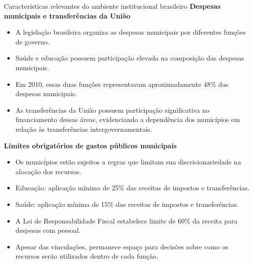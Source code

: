 \documentclass[
  10pt,
  ignorenonframetext,
  aspectratio=169,
  brazilian,
]{beamer}
\begin{document}
\begin{frame}{Características relevantes do ambiente institucional
brasileiro}
\protect{}\label{caracteruxedsticas-relevantes-do-ambiente-institucional-brasileiro}
\textbf{Despesas municipais e transferências da União}

\begin{itemize}
\item
  A legislação brasileira organiza as despesas municipais por diferentes
  funções de governo.
\item
  Saúde e educação possuem participação elevada na composição das
  despesas municipais.
\item
  Em 2010, essas duas funções representavam aproximadamente 48\% das
  despesas municipais.
\item
  As transferências da União possuem participação significativa no
  financiamento dessas áreas, evidenciando a dependência dos municípios
  em relação às transferências intergovernamentais.
\end{itemize}

\textbf{Limites obrigatórios de gastos públicos municipais}

\begin{itemize}
\item
  Os municípios estão sujeitos a regras que limitam sua
  discricionariedade na alocação dos recursos.
\item
  Educação: aplicação mínima de 25\% das receitas de impostos e
  transferências.
\item
  Saúde: aplicação mínima de 15\% das receitas de impostos e
  transferências.
\item
  A Lei de Responsabilidade Fiscal estabelece limite de 60\% da receita
  para despesas com pessoal.
\item
  Apesar das vinculações, permanece espaço para decisões sobre como os
  recursos serão utilizados dentro de cada função.
\end{itemize}
\end{frame}
\end{document}
